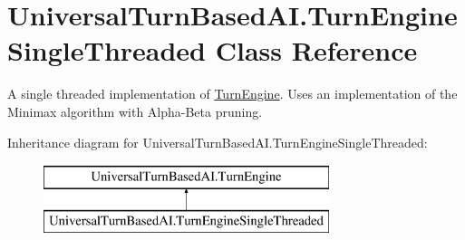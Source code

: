 \hypertarget{class_universal_turn_based_a_i_1_1_turn_engine_single_threaded}{}\section{Universal\+Turn\+Based\+A\+I.\+Turn\+Engine\+Single\+Threaded Class Reference}
\label{class_universal_turn_based_a_i_1_1_turn_engine_single_threaded}


A single threaded implementation of \hyperlink{class_universal_turn_based_a_i_1_1_turn_engine}{Turn\+Engine}. Uses an implementation of the Minimax algorithm with Alpha-\/\+Beta pruning.  


Inheritance diagram for Universal\+Turn\+Based\+A\+I.\+Turn\+Engine\+Single\+Threaded\+:\begin{figure}[H]
\begin{center}
\leavevmode
\includegraphics[height=2.000000cm]{class_universal_turn_based_a_i_1_1_turn_engine_single_threaded}
\end{center}
\end{figure}
